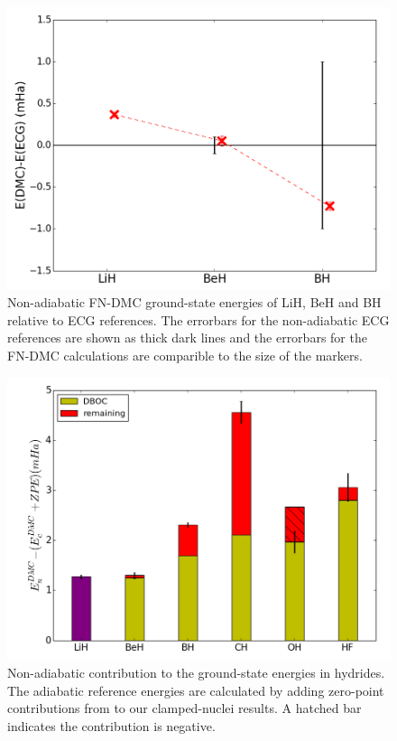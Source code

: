 \documentclass[pra,superscriptaddress,groupedaddress,twocolumn]{revtex4}
\begin{document}

\begin{figure}[h]
\centering
\includegraphics[scale=.37]{Figures/dia-ECG}
\caption{Non-adiabatic FN-DMC ground-state energies of LiH, BeH and BH relative to ECG references. The errorbars for the non-adiabatic ECG references are shown as thick dark lines and the errorbars for the FN-DMC calculations are comparible to the size of the markers. \label{fig:dia-ECG}}
\end{figure}

\begin{figure}[h]
\includegraphics[scale=.37]{Figures/dia-nad-ad}
\caption{Non-adiabatic contribution to the ground-state energies in hydrides. The adiabatic reference energies are calculated by adding zero-point contributions from \cite{Feller_Corrections} to our clamped-nuclei results. A hatched bar indicates the contribution is negative. \label{fig:dia-nad-ad}}
\end{figure}
\end{document}
